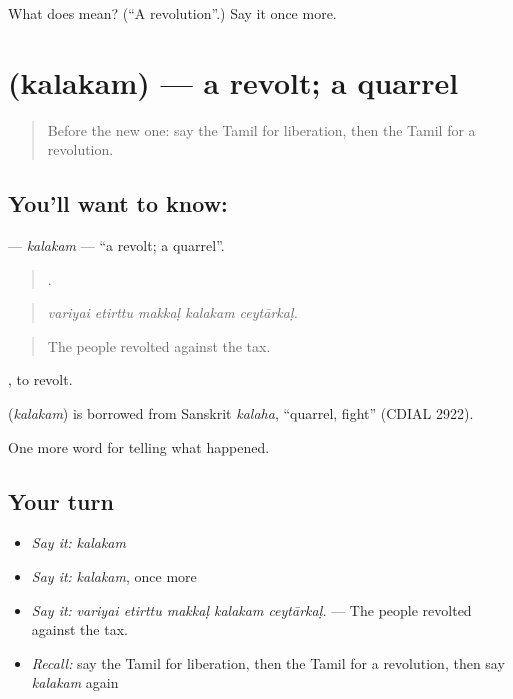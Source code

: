 \begin{tcolorbox}[breakable,colback=teal!4,colframe=teal!35!black,title={Before you move on}]
What does  mean? (\textquotedblleft{}A revolution\textquotedblright{}.) Say it once more.
\end{tcolorbox}
\section[\texorpdfstring{\ta{கலகம்} (kalakam)}{கலகம் (kalakam)}]{ (kalakam) — a revolt; a quarrel}

\label{lesson:TA-C338-kalakam}



\begin{quote}
Before the new one: say the Tamil for liberation, then the Tamil for a revolution.
\end{quote}

\subsection*{You'll want to know: }
\textbf{} — \emph{kalakam} — \textquotedblleft{}a revolt; a quarrel\textquotedblright{}.

\begin{quote}
    .
\end{quote}

\begin{quote}
\emph{variyai etirttu makkaḷ kalakam ceytārkaḷ.}
\end{quote}

\begin{quote}
The people revolted against the tax.
\end{quote}

 , to revolt.

\begin{cousinweb}
\textbf{} (\emph{kalakam}) is borrowed from Sanskrit \emph{kalaha}, \textquotedblleft{}quarrel, fight\textquotedblright{} (CDIAL 2922).
\end{cousinweb}

\begin{grammarlens}[title={What you've built}]
One more word for telling what happened.
\end{grammarlens}

\subsection*{Your turn}
\begin{itemize}
\raggedright
  \item \emph{Say it:} \emph{kalakam}
  \item \emph{Say it:} \emph{kalakam}, once more
  \item \emph{Say it:} \emph{variyai etirttu makkaḷ kalakam ceytārkaḷ.} — The people revolted against the tax.
  \item \emph{Recall:} say the Tamil for liberation, then the Tamil for a revolution, then say \emph{kalakam} again
\end{itemize}

